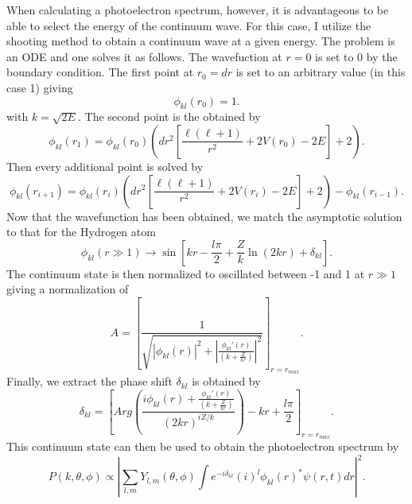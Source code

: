 When calculating a photoelectron spectrum, however, it is advantageous to be able to select the energy of the continuum wave. For this case, I utilize the shooting method to obtain a continuum wave at a given energy. The problem is an ODE and one solves it as follows. The wavefuction at $r=0$ is set to 0 by the boundary condition. The first point at $r_0=dr$ is set to an arbitrary value (in this case 1) giving 
\begin{equation}
    \phi_{kl}(r_0) = 1.
\end{equation}
with $k=\sqrt{2E}$. The second point is the obtained by
\begin{equation}
    \phi_{kl}(r_1) = \phi_{kl}(r_0) \left(dr^2\left[\frac{\ell (\ell+1)}{r^2} + 2V(r_0) -2 E\right]+2 \right). 
\end{equation}
Then every additional point is solved by 
\begin{equation}
    \phi_{kl}(r_{i+1}) = \phi_{kl}(r_i) \left(dr^2\left[\frac{\ell (\ell+1)}{r^2} + 2V(r_i) -2 E\right]+2 \right) - \phi_{kl}(r_{i-1}).
\end{equation}
Now that the wavefunction has been obtained, we match the asymptotic solution to that for the Hydrogen atom 
\begin{equation}
  \phi_{kl}(r\gg1) \rightarrow \sin\left[kr - \frac{l\pi}{2} +\frac{Z}{k} \ln(2kr) + \delta_{kl} \right].
\end{equation}
The continuum state is then normalized to oscillated between -1 and 1 at $r\gg1$ giving a normalization of
\begin{equation}
  A = \left[\frac{1}{\sqrt{|\phi_{kl}(r)|^2 + \left|\frac{\phi_{kl}'(r)}{(k+\frac{Z}{kr})}\right|^2}} \right]_{r=r_{max}}.
\end{equation}
Finally, we extract the phase shift $\delta_{kl}$ is obtained by
\begin{equation}
    \delta_{kl} = \left[Arg\left(\frac{i\phi_{kl}(r) + \frac{\phi_{kl}'(r)}{(k+\frac{Z}{kr})} }{(2kr)^{iZ/k}}\right) - kr + \frac{l\pi}{2} \right]_{r=r_{max}}.
\end{equation}
This continuum state can then be used to obtain the photoelectron spectrum by 
\begin{equation}
    P(k,\theta,\phi) \propto \left|\sum_{l,m} Y_{l,m}(\theta,\phi)\int  e^{-i\delta_{kl}}(i)^l \phi_{kl}(r)^* \psi(r,t) dr \right|^2.
\end{equation}

